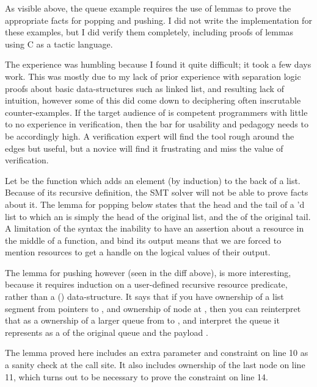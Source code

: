 As visible above, the queue example requires the use of lemmas to prove the
appropriate facts for popping and pushing. I did not write the implementation
for these examples, but I did verify them completely, including proofs of
lemmas using C as a tactic language.

The experience was humbling because I found it quite difficult; it took a few
days work. This was mostly due to my lack of prior experience with separation
logic proofs about basic data-structures such as linked list, and resulting
lack of intuition, however some of this did come down to deciphering often
inscrutable counter-examples. If the target audience of  is competent
programmers with little to no experience in verification, then the bar for
usability and pedagogy needs to be accordingly high. A verification expert
will find the tool rough around the edges but useful, but a novice will find
it frustrating and miss the value of verification.

Let  be the function which adds an element (by induction) to the
back of a list. Because of its recursive definition, the SMT solver will not be
able to prove facts about it. The lemma for popping below states that the head
and the tail of a 'd list to which an is simply the head of the
original list, and the  of the original tail. A limitation of the
syntax \textemdash{} the inability to have an assertion about a resource in the
middle of a function, and bind its output \textemdash{} means that we are
forced to mention resources to get a handle on the logical values of their
output.


The lemma for pushing however (seen in the diff above), is more interesting,
because it requires induction on a user-defined recursive resource predicate,
rather than a  () data-structure. It says that if you
have ownership of a list segment from pointers  to ,
and ownership of node  at , then you can
reinterpret that as a ownership of a larger queue from  to
, and interpret the  queue it represents as a
 of the original queue and the payload .

The lemma proved here includes an extra parameter and constraint on line 10 as
a sanity check at the call site. It also includes ownership of the last node on
line 11, which turns out to be necessary to prove the constraint on line 14.

